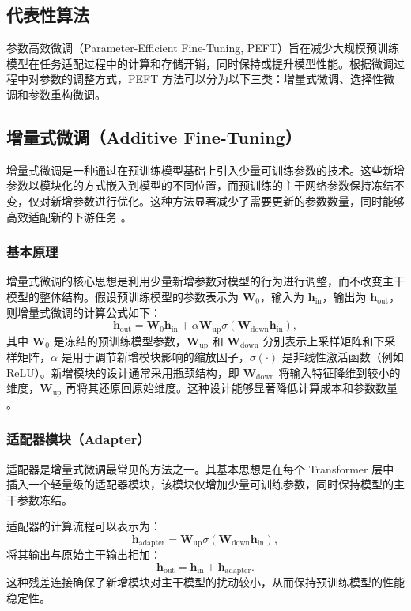 \documentclass[12pt,a4paper,twoside]{article} %
\begin{document}
\begin{multicols}{2}
\section{代表性算法}

参数高效微调（Parameter-Efficient Fine-Tuning, PEFT）旨在减少大规模预训练模型在任务适配过程中的计算和存储开销，同时保持或提升模型性能。根据微调过程中对参数的调整方式，PEFT 方法可以分为以下三类：增量式微调、选择性微调和参数重构微调。


\subsection{增量式微调（Additive Fine-Tuning）}

增量式微调是一种通过在预训练模型基础上引入少量可训练参数的技术。这些新增参数以模块化的方式嵌入到模型的不同位置，而预训练的主干网络参数保持冻结不变，仅对新增参数进行优化。这种方法显著减少了需要更新的参数数量，同时能够高效适配新的下游任务 \cite{han2024peft}。

\subsubsection{基本原理}
增量式微调的核心思想是利用少量新增参数对模型的行为进行调整，而不改变主干模型的整体结构。假设预训练模型的参数表示为 $\mathbf{W}_0$，输入为 $\mathbf{h}_{\text{in}}$，输出为 $\mathbf{h}_{\text{out}}$，则增量式微调的计算公式如下：
\begin{equation}
\mathbf{h}_{\text{out}} = \mathbf{W}_0 \mathbf{h}_{\text{in}} + \alpha \mathbf{W}_{\text{up}} \sigma(\mathbf{W}_{\text{down}} \mathbf{h}_{\text{in}}),
\label{eq:additive}
\end{equation}
其中 $\mathbf{W}_0$ 是冻结的预训练模型参数，$\mathbf{W}_{\text{up}}$ 和 $\mathbf{W}_{\text{down}}$ 分别表示上采样矩阵和下采样矩阵，$\alpha$ 是用于调节新增模块影响的缩放因子，$\sigma(\cdot)$ 是非线性激活函数（例如 ReLU）。新增模块的设计通常采用瓶颈结构，即 $\mathbf{W}_{\text{down}}$ 将输入特征降维到较小的维度，$\mathbf{W}_{\text{up}}$ 再将其还原回原始维度。这种设计能够显著降低计算成本和参数数量 \cite{adapter2021}。

\subsubsection{适配器模块（Adapter）}
适配器是增量式微调最常见的方法之一。其基本思想是在每个 Transformer 层中插入一个轻量级的适配器模块，该模块仅增加少量可训练参数，同时保持模型的主干参数冻结。

适配器的计算流程可以表示为：
\vspace{-\abovedisplayskip}
\begin{equation}
\mathbf{h}_{\text{adapter}} = \mathbf{W}_{\text{up}} \sigma(\mathbf{W}_{\text{down}} \mathbf{h}_{\text{in}}),
\end{equation}
\vspace{-\belowdisplayskip}
将其输出与原始主干输出相加：
\begin{equation}
\mathbf{h}_{\text{out}} = \mathbf{h}_{\text{in}} + \mathbf{h}_{\text{adapter}}.
\end{equation}
这种残差连接确保了新增模块对主干模型的扰动较小，从而保持预训练模型的性能稳定性。


\end{multicols}
\end{document}
